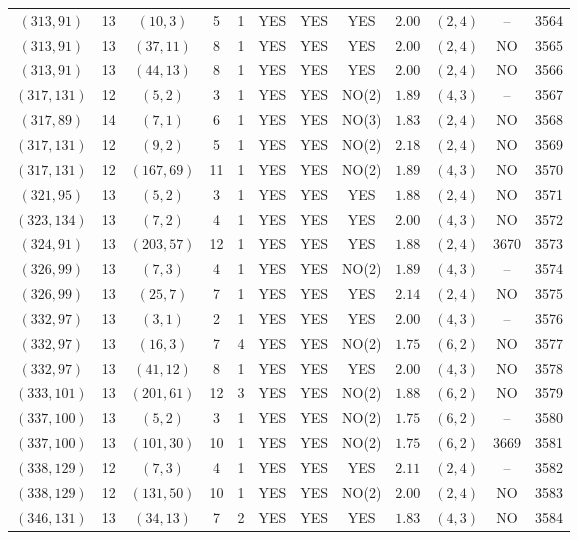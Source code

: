\begin{longtable}{|c|c|c|c|c|c|c|c|c|c|c|c|}
$(313,91)$ & 13 & $(10,3)$ & 5 & 1 & YES & YES & YES & $2.00$ & $(2,4)$ & -- & 3564\\
$(313,91)$ & 13 & $(37,11)$ & 8 & 1 & YES & YES & YES & $2.00$ & $(2,4)$ & NO & 3565\\
$(313,91)$ & 13 & $(44,13)$ & 8 & 1 & YES & YES & YES & $2.00$ & $(2,4)$ & NO & 3566\\
$(317,131)$ & 12 & $(5,2)$ & 3 & 1 & YES & YES & NO(2) & $1.89$ & $(4,3)$ & -- & 3567\\
$(317,89)$ & 14 & $(7,1)$ & 6 & 1 & YES & YES & NO(3) & $1.83$ & $(2,4)$ & NO & 3568\\
$(317,131)$ & 12 & $(9,2)$ & 5 & 1 & YES & YES & NO(2) & $2.18$ & $(2,4)$ & NO & 3569\\
$(317,131)$ & 12 & $(167,69)$ & 11 & 1 & YES & YES & NO(2) & $1.89$ & $(4,3)$ & NO & 3570\\
$(321,95)$ & 13 & $(5,2)$ & 3 & 1 & YES & YES & YES & $1.88$ & $(2,4)$ & NO & 3571\\
$(323,134)$ & 13 & $(7,2)$ & 4 & 1 & YES & YES & YES & $2.00$ & $(4,3)$ & NO & 3572\\
$(324,91)$ & 13 & $(203,57)$ & 12 & 1 & YES & YES & YES & $1.88$ & $(2,4)$ & 3670 & 3573\\
$(326,99)$ & 13 & $(7,3)$ & 4 & 1 & YES & YES & NO(2) & $1.89$ & $(4,3)$ & -- & 3574\\
$(326,99)$ & 13 & $(25,7)$ & 7 & 1 & YES & YES & YES & $2.14$ & $(2,4)$ & NO & 3575\\
$(332,97)$ & 13 & $(3,1)$ & 2 & 1 & YES & YES & YES & $2.00$ & $(4,3)$ & -- & 3576\\
$(332,97)$ & 13 & $(16,3)$ & 7 & 4 & YES & YES & NO(2) & $1.75$ & $(6,2)$ & NO & 3577\\
$(332,97)$ & 13 & $(41,12)$ & 8 & 1 & YES & YES & YES & $2.00$ & $(4,3)$ & NO & 3578\\
$(333,101)$ & 13 & $(201,61)$ & 12 & 3 & YES & YES & NO(2) & $1.88$ & $(6,2)$ & NO & 3579\\
$(337,100)$ & 13 & $(5,2)$ & 3 & 1 & YES & YES & NO(2) & $1.75$ & $(6,2)$ & -- & 3580\\
$(337,100)$ & 13 & $(101,30)$ & 10 & 1 & YES & YES & NO(2) & $1.75$ & $(6,2)$ & 3669 & 3581\\
$(338,129)$ & 12 & $(7,3)$ & 4 & 1 & YES & YES & YES & $2.11$ & $(2,4)$ & -- & 3582\\
$(338,129)$ & 12 & $(131,50)$ & 10 & 1 & YES & YES & NO(2) & $2.00$ & $(2,4)$ & NO & 3583\\
$(346,131)$ & 13 & $(34,13)$ & 7 & 2 & YES & YES & YES & $1.83$ & $(4,3)$ & NO & 3584\\

\end{longtable}
